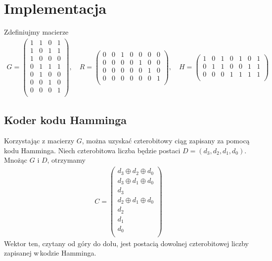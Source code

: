 \documentclass[a4paper,11pt]{article}
\begin{document}
  \section{Implementacja}
  Zdefiniujmy macierze
  \begin{gather*}
    G = \begin{pmatrix}
      1 & 1 & 0 & 1\\
      1 & 0 & 1 & 1\\
      1 & 0 & 0 & 0\\
      0 & 1 & 1 & 1\\
      0 & 1 & 0 & 0\\
      0 & 0 & 1 & 0\\
      0 & 0 & 0 & 1\\
    \end{pmatrix},\quad R = \begin{pmatrix}
      0 & 0 & 1 & 0 & 0 & 0 & 0 \\
      0 & 0 & 0 & 0 & 1 & 0 & 0 \\
      0 & 0 & 0 & 0 & 0 & 1 & 0 \\
      0 & 0 & 0 & 0 & 0 & 0 & 1 \\
    \end{pmatrix},\quad H = \begin{pmatrix}
      1 & 0 & 1 & 0 & 1 & 0 & 1 \\
      0 & 1 & 1 & 0 & 0 & 1 & 1 \\
      0 & 0 & 0 & 1 & 1 & 1 & 1 \\
    \end{pmatrix}
  \end{gather*}
  \subsection{Koder kodu Hamminga}
  Korzystając z macierzy $G$, można uzyskać czterobitowy ciąg zapisany za pomocą kodu Hamminga. Niech czterobitowa liczba będzie postaci $D = (d_3, d_2, d_1, d_0)$. Mnożąc $G$ i $D$, otrzymamy
  \begin{gather*} 
    C = \begin{pmatrix}
      d_3 \oplus d_2 \oplus d_0 \\
      d_3 \oplus d_1 \oplus d_0 \\
      d_3 \\
      d_2 \oplus d_1 \oplus d_0 \\
      d_2 \\
      d_1 \\
      d_0 \\
    \end{pmatrix}
  \end{gather*}
  Wektor ten, czytany od góry do dołu, jest postacią dowolnej czterobitowej liczby zapisanej w\,kodzie Hamminga.
\end{document}
